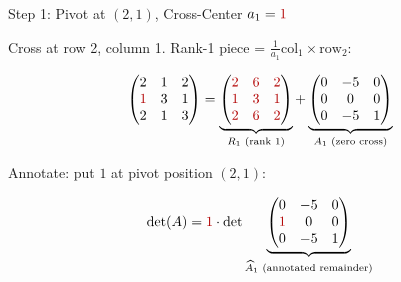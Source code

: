\documentclass[10pt]{beamer}
\theoremstyle{definition}
\newcommand{\rd}[1]{{\color{red!70!black}#1}}
\begin{document}
\begin{frame}{Step 1: Pivot at $(2,1)$, Cross-Center $a_1 = \rd{1}$}

Cross at row 2, column 1. Rank-1 piece = $\frac{1}{a_1}\text{col}_1 \times \text{row}_2$:

$$
\begin{pmatrix}
2 & 1 & 2 \\
\rd{1} & 3 & 1 \\
2 & 1 & 3
\end{pmatrix}
=
\underbrace{\begin{pmatrix}
\rd{2} & \rd{6} & \rd{2} \\
\rd{1} & \rd{3} & \rd{1} \\
\rd{2} & \rd{6} & \rd{2}
\end{pmatrix}}_{R_1\text{ (rank 1)}}
+
\underbrace{\begin{pmatrix}
0 & -5 & 0 \\
0 & 0 & 0 \\
0 & -5 & 1
\end{pmatrix}}_{A_1\text{ (zero cross)}}
$$

\vfill

Annotate: put $1$ at pivot position $(2,1)$:

$$
\det(A) = \rd{1} \cdot \det
\underbrace{\begin{pmatrix} 0 & -5 & 0 \\ \rd{1} & 0 & 0 \\ 0 & -5 & 1 \end{pmatrix}}_{\widehat{A}_1\text{ (annotated remainder)}}
$$

\end{frame}
\end{document}

